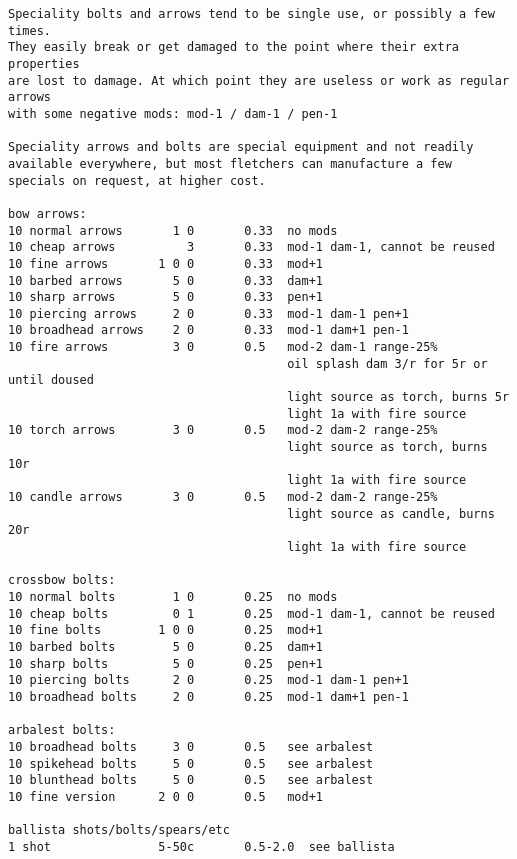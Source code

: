 \begin{verbatim}
Speciality bolts and arrows tend to be single use, or possibly a few times.
They easily break or get damaged to the point where their extra properties
are lost to damage. At which point they are useless or work as regular arrows
with some negative mods: mod-1 / dam-1 / pen-1

Speciality arrows and bolts are special equipment and not readily available everywhere, but most fletchers can manufacture a few specials on request, at higher cost.

bow arrows:
10 normal arrows       1 0       0.33  no mods
10 cheap arrows          3       0.33  mod-1 dam-1, cannot be reused
10 fine arrows       1 0 0       0.33  mod+1
10 barbed arrows       5 0       0.33  dam+1
10 sharp arrows        5 0       0.33  pen+1
10 piercing arrows     2 0       0.33  mod-1 dam-1 pen+1
10 broadhead arrows    2 0       0.33  mod-1 dam+1 pen-1
10 fire arrows         3 0       0.5   mod-2 dam-1 range-25%
                                       oil splash dam 3/r for 5r or until doused
                                       light source as torch, burns 5r
                                       light 1a with fire source
10 torch arrows        3 0       0.5   mod-2 dam-2 range-25%
                                       light source as torch, burns 10r
                                       light 1a with fire source
10 candle arrows       3 0       0.5   mod-2 dam-2 range-25%
                                       light source as candle, burns 20r
                                       light 1a with fire source

crossbow bolts:
10 normal bolts        1 0       0.25  no mods
10 cheap bolts         0 1       0.25  mod-1 dam-1, cannot be reused
10 fine bolts        1 0 0       0.25  mod+1
10 barbed bolts        5 0       0.25  dam+1
10 sharp bolts         5 0       0.25  pen+1
10 piercing bolts      2 0       0.25  mod-1 dam-1 pen+1
10 broadhead bolts     2 0       0.25  mod-1 dam+1 pen-1

arbalest bolts:
10 broadhead bolts     3 0       0.5   see arbalest
10 spikehead bolts     5 0       0.5   see arbalest
10 blunthead bolts     5 0       0.5   see arbalest
10 fine version      2 0 0       0.5   mod+1

ballista shots/bolts/spears/etc
1 shot               5-50c       0.5-2.0  see ballista
\end{verbatim}
\normalsize







